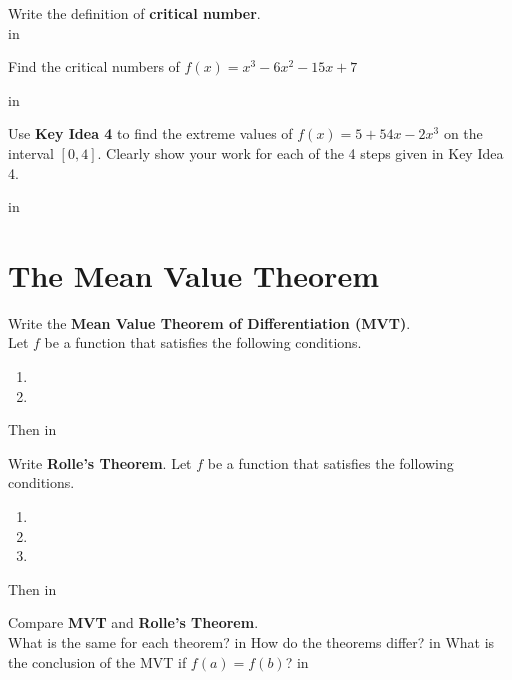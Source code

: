\documentclass[11pt]{report}
\newlength\tindent
\renewcommand{\indent}{\hspace*{\tindent}}
\begin{document}
Write the definition of \textbf{critical number}.\\

 in

Find the critical numbers of $f(x)=x^3-6x^2-15x+7$

 in

Use \textbf{Key Idea 4} to find the extreme values of $f(x)=5+54x-2x^3$ on the interval $[0,4]$. Clearly show your work for each of the 4 steps given in Key Idea 4.

 in


\newpage



\section{The Mean Value Theorem}

Write the \textbf{Mean Value Theorem of Differentiation (MVT)}.\\
\indent Let $f$ be a function that satisfies the following conditions.
\begin{doublespacing}
\begin{enumerate}
\item
\item  
\end{enumerate}
\end{doublespacing}
Then
 in 

Write \textbf{Rolle's Theorem}.
\indent Let $f$ be a function that satisfies the following conditions.
\begin{doublespacing}
\begin{enumerate}
\item
\item  
\item
\end{enumerate}
\end{doublespacing}
Then
 in 

Compare \textbf{MVT} and \textbf{Rolle's Theorem}.\\
\indent  What is the same for each theorem?
 in
\indent How do the theorems differ?
 in
\indent What is the conclusion of the MVT if $f(a)=f(b)$?
 in
\end{document}
